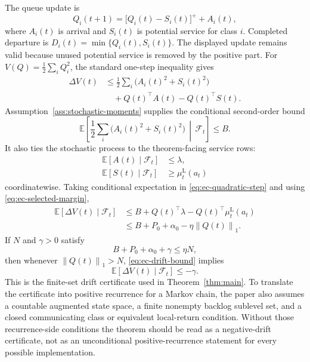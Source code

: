 \documentclass[opre,dblanonrev]{informs4}
\newcommand{\E}{\mathbb E}
\newcommand{\lowermu}{\mu^{\mathrm L}}
\newcommand{\normone}[1]{\left\|#1\right\|_1}
\begin{document}
The queue update is
\begin{equation}
  Q_i(t+1)=\bigl[Q_i(t)-S_i(t)\bigr]^+ + A_i(t),
\end{equation}
where \(A_i(t)\) is arrival and \(S_i(t)\) is potential service for class \(i\).
Completed departure is
\(D_i(t)=\min\{Q_i(t),S_i(t)\}\).  The displayed update remains valid because
unused potential service is removed by the positive part.
For \(V(Q)=\frac12\sum_i Q_i^2\), the standard one-step inequality gives
\begin{equation}
  \label{eq:ec-quadratic-step}
  \begin{aligned}
  \Delta V(t)
  &\le
  \frac12\sum_i\bigl(A_i(t)^2+S_i(t)^2\bigr)\\
  &\quad{}+Q(t)^\top A(t)-Q(t)^\top S(t).
  \end{aligned}
\end{equation}
Assumption~\ref{ass:stochastic-moments} supplies the conditional second-order
bound
\begin{equation}
  \E\!\left[
    \frac12\sum_i\bigl(A_i(t)^2+S_i(t)^2\bigr)
    \,\middle|\,\mathcal F_t
  \right]\le B.
\end{equation}
It also ties the stochastic process to the theorem-facing service rows:
\begin{align}
  \label{eq:ec-arrival-domination}
  \E[A(t)\mid\mathcal F_t]&\le\lambda,\\
  \label{eq:ec-service-domination}
  \E[S(t)\mid\mathcal F_t]&\ge\lowermu_t(a_t)
\end{align}
coordinatewise.  Taking conditional expectation in
\eqref{eq:ec-quadratic-step} and using \eqref{eq:ec-selected-margin},
\begin{equation}
  \label{eq:ec-drift-bound}
  \begin{aligned}
  \E[\Delta V(t)\mid\mathcal F_t]
  &\le
  B+Q(t)^\top\lambda-Q(t)^\top\lowermu_t(a_t)\\
  &\le
  B+P_0+\alpha_0-\eta\normone{Q(t)}.
  \end{aligned}
\end{equation}
If \(N\) and \(\gamma>0\) satisfy
\begin{equation}
  B+P_0+\alpha_0+\gamma\le\eta N,
\end{equation}
then whenever \(\normone{Q(t)}>N\), \eqref{eq:ec-drift-bound} implies
\begin{equation}
  \E[\Delta V(t)\mid\mathcal F_t]\le-\gamma.
\end{equation}
This is the finite-set drift certificate used in
Theorem~\ref{thm:main}.  To translate the certificate into positive recurrence
for a Markov chain, the paper also assumes a countable augmented state space,
a finite nonempty backlog sublevel set, and a closed communicating class or
equivalent local-return condition.  Without those recurrence-side conditions the theorem
should be read as a negative-drift certificate, not as an unconditional
positive-recurrence statement for every possible implementation.
\end{document}
